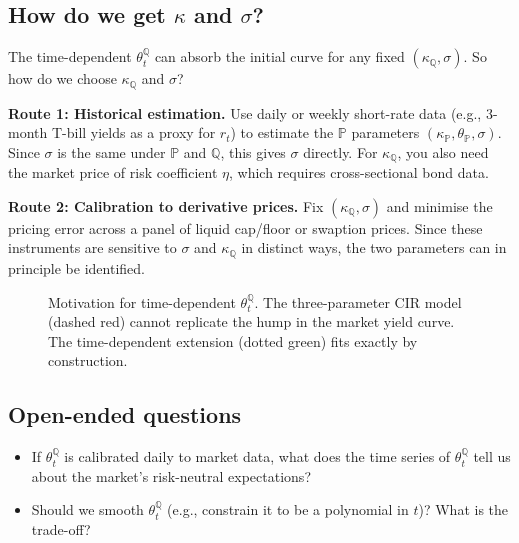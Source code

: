 \documentclass[11pt]{article}
\newcommand{\PP}{\mathbb{P}}
\newcommand{\QQ}{\mathbb{Q}}
\begin{document}
\subsection{How do we get $\kappa$ and $\sigma$?}

The time-dependent $\theta_t^\QQ$ can absorb the initial curve for any
fixed $(\kappa_\QQ, \sigma)$.  So how do we choose $\kappa_\QQ$ and
$\sigma$?

\textbf{Route 1: Historical estimation.}  Use daily or weekly short-rate
data (e.g., 3-month T-bill yields as a proxy for $r_t$) to estimate the
$\PP$ parameters $(\kappa_\PP, \theta_\PP, \sigma)$.  Since $\sigma$ is
the same under $\PP$ and $\QQ$, this gives $\sigma$ directly.  For
$\kappa_\QQ$, you also need the market price of risk coefficient $\eta$,
which requires cross-sectional bond data.

\textbf{Route 2: Calibration to derivative prices.}  Fix $(\kappa_\QQ,\sigma)$
and minimise the pricing error across a panel of liquid cap/floor or
swaption prices.  Since these instruments are sensitive to $\sigma$ and
$\kappa_\QQ$ in distinct ways, the two parameters can in principle be
identified.

\begin{figure}[ht]
\centering
{}
\caption{Motivation for time-dependent $\theta_t^\QQ$.  The three-parameter CIR model
(dashed red) cannot replicate the hump in the market yield curve.  The
time-dependent extension (dotted green) fits exactly by construction.}
\end{figure}

\subsection*{Open-ended questions}
\begin{itemize}
  \item If $\theta_t^\QQ$ is calibrated daily to market data, what does the
  time series of $\theta_t^\QQ$ tell us about the market's risk-neutral
  expectations?
  \item Should we smooth $\theta_t^\QQ$ (e.g., constrain it to be a
  polynomial in $t$)?  What is the trade-off?
\end{itemize}
\end{document}
